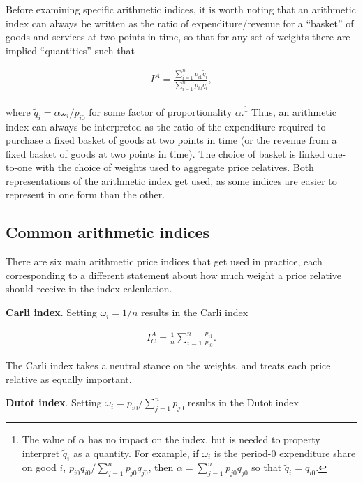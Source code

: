 \documentclass[]{article}
\begin{document}
Before examining specific arithmetic indices, it is worth noting that an arithmetic index can always be written as the ratio of expenditure/revenue for a ``basket'' of goods and services at two points in time, so that for any set of weights there are implied ``quantities'' such that

\begin{align*}
I^{A} = \frac{\sum_{i = 1}^{n} p_{i1} \tilde{q}_{i}}{\sum_{i = 1}^{n} p_{i0} \tilde{q}_{i}},
\end{align*}

where \(\tilde{q}_{i} = \alpha \omega_{i} / p_{i0}\) for some factor of proportionality \(\alpha\).\footnote{The value of \(\alpha\) has no impact on the index, but is needed to property interpret \(\tilde{q}_{i}\) as a quantity. For example, if \(\omega_{i}\) is the period-0 expenditure share on good \(i\), \(p_{i0} q_{i0} / \sum_{j = 1}^{n} p_{j0} q_{j0}\), then \(\alpha = \sum_{j = 1}^{n} p_{j0} q_{j0}\) so that \(\tilde{q}_{i} = q_{i0}\).} Thus, an arithmetic index can always be interpreted as the ratio of the expenditure required to purchase a fixed basket of goods at two points in time (or the revenue from a fixed basket of goods at two points in time). The choice of basket is linked one-to-one with the choice of weights used to aggregate price relatives. Both representations of the arithmetic index get used, as some indices are easier to represent in one form than the other.

\hypertarget{common-arithmetic-indices}{%
\subsection{Common arithmetic indices}\label{common-arithmetic-indices}}

There are six main arithmetic price indices that get used in practice, each corresponding to a different statement about how much weight a price relative should receive in the index calculation.

\textbf{Carli index}. Setting \(\omega_{i} = 1 / n\) results in the Carli index

\begin{align*}
I^{A}_{C} = \frac{1}{n} \sum_{i = 1}^{n} \frac{p_{i1}}{p_{i0}}.
\end{align*}

The Carli index takes a neutral stance on the weights, and treats each price relative as equally important.

\textbf{Dutot index}. Setting \(\omega_{i} = p_{i0} / \sum_{j = 1}^{n} p_{j0}\) results in the Dutot index
\end{document}
